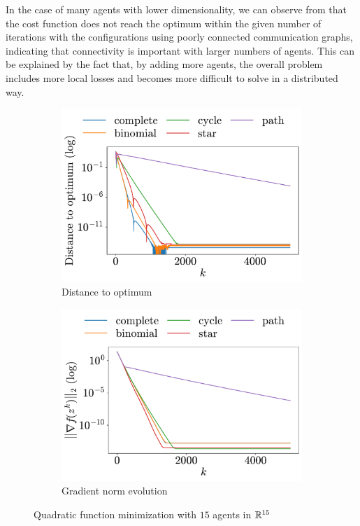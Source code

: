 \documentclass[a4paper,11pt,oneside]{book}
\begin{document}
In the case of many agents with lower dimensionality, we can observe from  that the cost function does not reach the optimum within the given number of iterations with the configurations using poorly connected communication graphs, indicating that connectivity is important with larger numbers of agents. This can be explained by the fact that, by adding more agents, the overall problem includes more local losses and becomes more difficult to solve in a distributed way.


\begin{figure}[h!]
      \centering
      \begin{subfigure}[h]{0.42\linewidth}
            \centering
            \includegraphics[width=\linewidth]{./figs/quadratic/15_15/distance.pdf} 
            \caption{Distance to optimum}
      \end{subfigure}
      \hfill
      \begin{subfigure}[h]{0.42\linewidth}
            \centering
            \includegraphics[width=\linewidth]{./figs/quadratic/15_15/gradient.pdf} 
            \caption{Gradient norm evolution}
      \end{subfigure}
      \caption{Quadratic function minimization with $15$ agents in ${\mathbb{R}}^{15}$}
      \label{fig:quadratic_15_15}
\end{figure}
\end{document}
